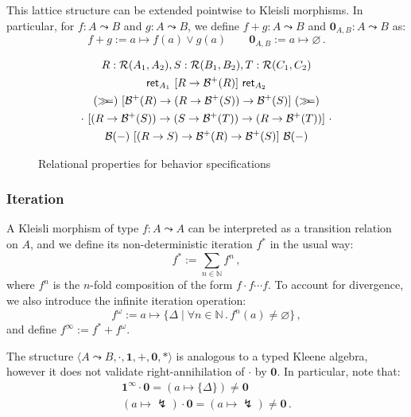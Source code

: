 This lattice structure
can be extended pointwise to Kleisli morphisms.
In particular, for $f : A \leadsto B$ and $g : A \leadsto B$,
we define $f + g : A \leadsto B$ and $\mathbf{0}_{A,B} : A \leadsto B$ as:
\[
  f + g := a \mapsto f(a) \vee g(a) \qquad
  \mathbf{0}_{A,B} := a \mapsto \varnothing \,.
\]

\begin{figure}
  \begin{gather*}
    R : \mathcal{R}(A_1, A_2),
    S : \mathcal{R}(B_1, B_2),
    T : \mathcal{R}(C_1, C_2) \\
     \mathsf{ret} _{A_1}
        \ [{R \rightarrow \mathcal{B}^+(R)}]\ 
         \mathsf{ret} _{A_2} \\
    ({\gg\!\!=})
        \ [{\mathcal{B}^+(R) \rightarrow (R \rightarrow \mathcal{B}^+(S))
          \rightarrow \mathcal{B}^+(S)}]\ 
        ({\gg\!\!=}) \\
    {\cdot}
        \ [{(R \rightarrow \mathcal{B}^+(S)) \rightarrow
             (S \rightarrow \mathcal{B}^+(T)) \rightarrow
             (R \rightarrow \mathcal{B}^+(T))}]\ 
        {\cdot} \\
    \mathcal{B}(-)
        \ [{(R \rightarrow S) \rightarrow
             \mathcal{B}^+(R) \rightarrow \mathcal{B}^+(S)}]\ 
        \mathcal{B}(-)
  \end{gather*}
  \caption{Relational properties for behavior specifications}
  \label{fig:monadr}
\end{figure}

\subsubsection{Iteration}

A Kleisli morphism of type $f : A \leadsto A$
can be interpreted as a transition relation on $A$,
and we define its non-deterministic iteration $f^*$
in the usual way:
\[
    f^* := \sum_{n \in \mathbb{N}} f^n \,,
\]
where $f^n$ is
the $n$-fold composition of the form $f \cdot f \cdots f$.
To account for divergence,
we also introduce the infinite iteration operation:
\[
    f^\omega := a \mapsto \{ \Delta \mid
      \forall n \in \mathbb{N} \,.\,
      f^n(a) \ne \varnothing \} \,,
\]
and define $f^\infty := f^* + f^\omega$.

The structure
$\langle A \leadsto B, {\cdot}, \mathbf{1}, {+}, \mathbf{0}, * \rangle$
is analogous to a typed Kleene algebra,
however it does not validate right-annihilation of $\cdot$ by $\mathbf{0}$.
In particular, note that:
\begin{gather*}
  \mathbf{1}^\infty \cdot \mathbf{0} =
    (a \mapsto \{ \Delta \}) \ne \mathbf{0} \\
  (a \mapsto \lightning) \cdot \mathbf{0} =
    (a \mapsto \lightning) \ne \mathbf{0} \,.
\end{gather*}

